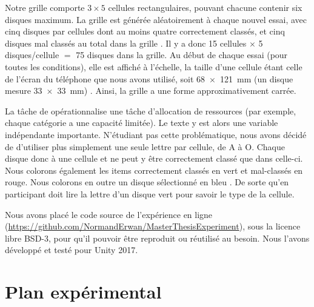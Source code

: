 Notre grille comporte $3 \times 5$ cellules rectangulaires, pouvant chacune contenir six disques maximum. La grille est générée aléatoirement à chaque nouvel essai, avec cinq disques par cellules dont au moins quatre correctement classés, et cinq disques mal classés au total dans la grille . Il y a donc 15 cellules $\times$ 5 disques/cellule $=$ 75 disques dans la grille. Au début de chaque essai (pour toutes les conditions), elle est affiché à l'échelle, la taille d'une cellule étant celle de l'écran du téléphone que nous avons utilisé, soit \SI{68x121}{\mm} (un disque mesure \SI{33x33}{\mm}) . Ainsi, la grille a une forme approximativement carrée.


La tâche de \cite{Liu2014} opérationnalise une tâche d'allocation de ressources (par exemple, chaque catégorie a une capacité limitée). Le texte y est alors une variable indépendante importante. N'étudiant pas cette problématique, nous avons décidé de d'utiliser plus simplement une seule lettre par cellule, de A à O. Chaque disque  donc à une cellule et ne peut y être correctement classé que dans celle-ci. Nous colorons également les items correctement classés en vert et mal-classés en rouge. Nous colorons en outre un disque sélectionné en bleu . De sorte qu'en participant doit lire la lettre d'un disque vert pour savoir le type de la cellule.

Nous avons placé le code source de l'expérience en ligne (\url{https://github.com/NormandErwan/MasterThesisExperiment}), sous la licence libre BSD-3, pour qu'il pouvoir être reproduit ou réutilisé au besoin. Nous l'avons développé et testé pour Unity 2017.


\section{Plan expérimental}
\label{sec:experiment_design}


